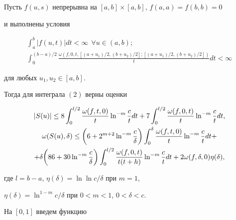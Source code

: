 \begin{thm}


Пусть $f(u,s)$ непрерывна на $[a,b]\times[a,b]$, $f(a,a)=f(b,b)=0$


и выполнены условия


\begin{gather*}


\int^b_a|f(u,t)|d t<\infty\ \ \forall u\in(a,b);\\


%


\int^{(b-a)/2}_0 \frac{\omega(f,0,t,[(a+u_1)/2,


(b+u_2)/2];[(a+u_1)/2,(b+u_2)/2])}


{t}d t<\infty


\end{gather*}


для любых $u_1,u_2\in[a,b]$.





Тогда для интеграла $(2)$ верны оценки


\begin{gather}


|S(u)|\le8\int^{l/2}_0\frac{\omega(f,t,0)}{t}\ln^{-m}


\frac{c}{t}d t+7\int^{l/2}_0


\frac{\omega(f,0,t)}{t}\ln^{-m}\frac{c}{t}d t, \\


\omega(S(u),\delta)\le\bigg(6+2^{m+2}\ln^{-m}


\frac{c}{\delta}\bigg)\int^\delta_0


\frac{\omega(f,t,0)}{t}\ln^{-m}\frac{c}{t}d t+ \notag \\


%


+\delta\bigg(86+30\ln^{-m}\frac{c}{\delta}\bigg)


\int^{l/2}_0\frac{\omega(f,0,t)}{t(t+h)}\ln^{-m}


\frac{c}{t}d t+2\omega(f,\delta,0)\eta(\delta),\notag


\end{gather}


где $l=b-a$, $\eta(\delta)=\ln\ln c/\delta$ при $m=1$, 


$\eta(\delta)=\ln^{1-m}c/\delta$ при $0<m<1$, $0<\delta<c$.


\end{thm}





На $[0,1]$ введем функцию


